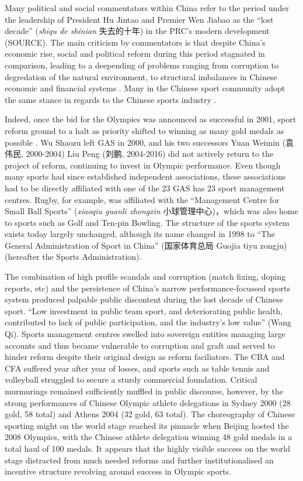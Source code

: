 {Many political and social commentators within China refer to the period under the leadership of President Hu Jintao and Premier Wen Jiabao as the ``lost decade'' (\textit{shiqu de shinian} 失去的十年) in the PRC's modern development (SOURCE). The main criticism by commentators is that despite China's economic rise, social and political reform during this period stagnated in comparison, leading to a deepending of problems ranging from corruption to degredation of the natural environment, to structural imbalances in Chinese economic and financial systems \citep{Barme2014}.  Many in the Chinese sport community adopt the same stance in regards to the Chinese sports industry \citep{News2017}.

Indeed, once the bid for the Olympics was announced as successful in 2001, sport reform ground to a halt as priority shifted to winning as many gold medals as possible \citep{News2017}.  Wu Shaozu left GAS in 2000, and his two successors Yuan Weimin (袁伟民, 2000-2004) Liu Peng (刘鹏, 2004-2016) did not actively return to the project of reform, continuing to invest in Olympic performance.  Even though many sports had since established independent associations, these associations had to be directly affiliated with one of the 23 GAS has 23 sport management centres. Rugby, for example, was affiliated with the ``Management Centre for Small Ball Sports'' (\textit{xiaoqiu guanli zhongxin} 小球管理中心)，which was also home to sports such as Golf and Ten-pin Bowling.  The structure of the sports system exists today largely unchanged, although its name changed in 1998 to “The General Administration of Sport in China” (国家体育总局 Guojia tiyu zongju) (hereafter the Sports Administration).

The combination of high profile scandals and corruption (match fixing, doping reports, etc) and the persistence of China's narrow performance-focussed sports system produced palpable public discontent during the lost decade of Chinese sport. ``Low investment in public team sport, and deteriorating public health, contributed to lack of public participation, and the industry’s low value'' (Wang Qi). Sports management centres swelled into sovereign entities managing large accounts and thus became vulnerable to corruption and graft and served to hinder reform despite their original design as reform faciliators. The CBA and CFA suffered year after year of losses, and sports such as table tennis and volleyball struggled to secure a sturdy commercial foundation. Critical murmurings remained sufficiently muffled in public discourse, however, by the strong performances of Chinese Olympic athlete delegations in Sydney 2000 (28 gold, 58 total) and Athens 2004 (32 gold, 63 total). The choreography of Chinese sporting might on the world stage reached its pinnacle when Beijing hosted the 2008 Olympics, with the Chinese athlete delegation winning 48 gold medals in a total haul of 100 medals.  It appears that the highly visible success on the world stage distracted from much needed reforms and further institutionalised an incentive structure revolving around success in Olympic sports.

}
